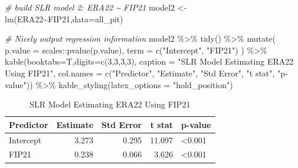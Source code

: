 \documentclass[
  11pt,
]{book}
\newenvironment{Shaded}{\begin{snugshade}}{\end{snugshade}}
\newcommand{\AttributeTok}[1]{\textcolor[rgb]{0.77,0.63,0.00}{#1}}
\newcommand{\CommentTok}[1]{\textcolor[rgb]{0.56,0.35,0.01}{\textit{#1}}}
\newcommand{\DecValTok}[1]{\textcolor[rgb]{0.00,0.00,0.81}{#1}}
\newcommand{\FunctionTok}[1]{\textcolor[rgb]{0.00,0.00,0.00}{#1}}
\newcommand{\NormalTok}[1]{#1}
\newcommand{\OtherTok}[1]{\textcolor[rgb]{0.56,0.35,0.01}{#1}}
\newcommand{\SpecialCharTok}[1]{\textcolor[rgb]{0.00,0.00,0.00}{#1}}
\newcommand{\StringTok}[1]{\textcolor[rgb]{0.31,0.60,0.02}{#1}}
\theoremstyle{definition}
\theoremstyle{definition}
\theoremstyle{definition}
\theoremstyle{definition}
\theoremstyle{remark}
\begin{document}
\newpage

\begin{Shaded}
\begin{Highlighting}[]
\CommentTok{\# build SLR model 2: ERA22 \textasciitilde{} FIP21}
\NormalTok{model2 }\OtherTok{\textless{}{-}} \FunctionTok{lm}\NormalTok{(ERA22}\SpecialCharTok{\textasciitilde{}}\NormalTok{FIP21,}\AttributeTok{data=}\NormalTok{all\_pit)}

\CommentTok{\# Nicely output regression information}
\NormalTok{model2 }\SpecialCharTok{\%\textgreater{}\%} \FunctionTok{tidy}\NormalTok{() }\SpecialCharTok{\%\textgreater{}\%}
  \FunctionTok{mutate}\NormalTok{(}
    \AttributeTok{p.value =}\NormalTok{ scales}\SpecialCharTok{::}\FunctionTok{pvalue}\NormalTok{(p.value),}
    \AttributeTok{term =} \FunctionTok{c}\NormalTok{(}\StringTok{"Intercept"}\NormalTok{, }\StringTok{"FIP21"}\NormalTok{)}
\NormalTok{  ) }\SpecialCharTok{\%\textgreater{}\%}
  \FunctionTok{kable}\NormalTok{(}\AttributeTok{booktabs=}\NormalTok{T,}\AttributeTok{digits=}\FunctionTok{c}\NormalTok{(}\DecValTok{3}\NormalTok{,}\DecValTok{3}\NormalTok{,}\DecValTok{3}\NormalTok{,}\DecValTok{3}\NormalTok{), }
        \AttributeTok{caption =} \StringTok{"SLR Model Estimating ERA22 Using FIP21"}\NormalTok{,}
        \AttributeTok{col.names =} \FunctionTok{c}\NormalTok{(}\StringTok{"Predictor"}\NormalTok{, }\StringTok{"Estimate"}\NormalTok{, }\StringTok{"Std Error"}\NormalTok{, }\StringTok{"t stat"}\NormalTok{, }\StringTok{"p{-}value"}\NormalTok{)) }\SpecialCharTok{\%\textgreater{}\%}
  \FunctionTok{kable\_styling}\NormalTok{(}\AttributeTok{latex\_options =} \StringTok{"hold\_position"}\NormalTok{)}
\end{Highlighting}
\end{Shaded}

\begin{table}[!h]

\caption{\label{tab:unnamed-chunk-189}SLR Model Estimating ERA22 Using FIP21}
\centering
\begin{tabular}[t]{lrrrl}
\toprule
Predictor & Estimate & Std Error & t stat & p-value\\
\midrule
Intercept & 3.273 & 0.295 & 11.097 & <0.001\\
FIP21 & 0.238 & 0.066 & 3.626 & <0.001\\
\bottomrule
\end{tabular}
\end{table}
\end{document}
